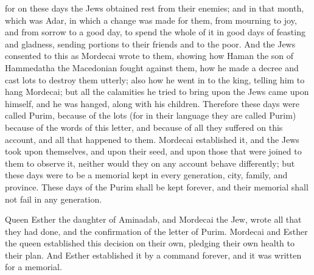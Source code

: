 {for on these days the Jews obtained rest from their enemies; and in that month, which was Adar, in which a change was made for them, from mourning to joy, and from sorrow to a good day, to spend the whole of it in good days of
 feasting and gladness, sending portions to their friends and to the poor.
And the Jews consented to this as Mordecai wrote to them,
showing how Haman the son of Hammedatha the Macedonian fought against them, how he made a decree and cast
 lots to destroy them utterly;
also how he went in to the king, telling him to hang Mordecai; but all the calamities he tried to bring upon the Jews came upon himself, and he was hanged, along with his children.
Therefore these days were called Purim, because of the lots (for in their language they are called Purim) because of the words of this letter, and because of all they suffered on this account, and all that happened to them.
Mordecai established it, and the Jews took upon themselves, and upon their seed, and upon those that were joined to them to observe it, neither would they on any account behave differently; but these days were to be a memorial kept in every generation, city, family, and province.
These days of the Purim shall be kept forever, and their memorial shall not fail in any generation.
\par }{\PP {}Queen Esther the daughter of Aminadab, and Mordecai the Jew, wrote all that they had done, and the confirmation of the letter of Purim.
Mordecai and Esther the queen established this decision on their own, pledging their own health to their plan.
And Esther established it by a command forever, and it was written for a memorial.

}

